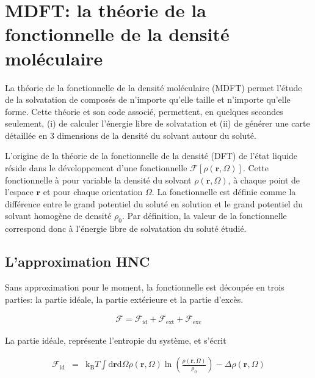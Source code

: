 \chapter{MDFT: la théorie de la fonctionnelle de la densité moléculaire}
\label{chap:theorie}



La théorie de la fonctionnelle de la densité moléculaire (MDFT) permet l'étude de la solvatation de composés de n'importe qu'elle taille et n'importe qu'elle forme. Cette théorie et son code associé, permettent, en quelques secondes seulement, (i) de calculer l'énergie libre de solvatation et (ii) de générer une carte détaillée en 3 dimensions de la densité du solvant autour du soluté.


L'origine de la théorie de la fonctionnelle de la densité (DFT) de l'état liquide réside dans le développement d'une fonctionnelle $\mathcal{F}[\rho\left(\boldsymbol{r},\Omega \right)]$. Cette fonctionnelle à pour variable la densité du solvant $\rho\left(\boldsymbol{r},\Omega \right)$, à chaque point de l'espace $\boldsymbol{r}$ et pour chaque orientation $\Omega$. La fonctionnelle est définie comme la différence entre le grand potentiel du soluté en solution et le grand potentiel du solvant homogène de densité $\rho_{0}$. Par définition, la valeur de la fonctionnelle correspond donc à l'énergie libre de solvatation du soluté étudié. 

\section{L'approximation HNC}

Sans approximation pour le moment, la fonctionnelle est découpée en trois parties: la partie idéale, la partie extérieure et la partie d'excès\cite{evans_density_2009,henderson_fundamentals_1992}. 


\begin{eqnarray}
\mathcal{F} = \mathcal{F}_\mathrm{id} + \mathcal{F}_\mathrm{ext} + \mathcal{F}_\mathrm{exc}
\end{eqnarray}

La partie idéale, représente l’entropie du système, et s'écrit

\begin{eqnarray}
\mathcal{F}_\mathrm{id}&=&\mathrm{k_B}T\int\mathrm{d}\boldsymbol{r}\mathrm{d}\Omega \rho\left(\boldsymbol{r},\Omega \right)\ln\left(\frac{\rho\left(\boldsymbol{r},\Omega \right)}{\rho_0}\right)-\Delta\rho\left(\boldsymbol{r},\Omega \right)
\end{eqnarray}


